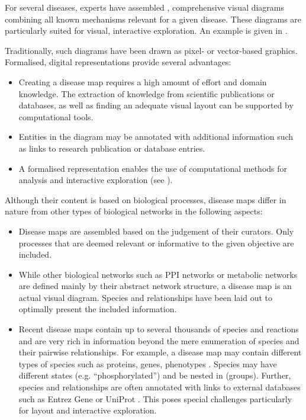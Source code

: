 \documentclass[
	fontsize=10pt, %
	twoside=false, %
	secnumdepth=1, %
  toc=indentunnumbered %
]{kaobook}
\begin{document}
For several diseases, experts have assembled
, comprehensive visual diagrams combining all known mechanisms
relevant for a given disease.
These diagrams are particularly suited for visual, interactive exploration.
An example is given in
.

Traditionally, such diagrams have been drawn as pixel- or vector-based graphics.
Formalised, digital representations provide several advantages:
\begin{itemize}
  \item Creating a disease map requires a high amount of effort and domain
    knowledge. The extraction of knowledge from scientific publications or
    databases, as well as finding an adequate visual layout can be supported by
    computational tools.
\item Entities in the diagram may be annotated with additional information
  such as links to research publication or database entries.
\item A formalised representation enables the use of computational methods for
  analysis and interactive exploration (see ).
\end{itemize}

Although their content is based on biological processes, disease maps differ in
nature from other types of biological networks in the following aspects:
\begin{itemize}
\item Disease maps are assembled based on the judgement of their curators. Only
  processes that are deemed relevant or informative to the given objective are
  included.
\item While other biological networks such as PPI networks or metabolic networks
  are defined mainly by their abstract network structure, a disease map is an
  actual visual diagram. Species and relationships have been laid out to
  optimally present the included information.
\item
  Recent disease maps contain up to several thousands of species and reactions and
  are very rich in information beyond the mere enumeration of species and their
  pairwise relationships. For example, a disease map may contain different types
  of species such as proteins, genes, phenotypes \etc. Species may have
  different states (e.g. ``phosphorylated'') and be nested in 
  (groups). Further, species and relationships are often
  annotated with links to external databases such as Entrez Gene
  \cite{maglott_EntrezGeneGenecentered_2005} or UniProt
  \cite{theuniprotconsortium_UniProtUniversalProtein_2021}.
  This poses special challenges particularly for layout and
  interactive exploration. 
\end{itemize}
\end{document}
